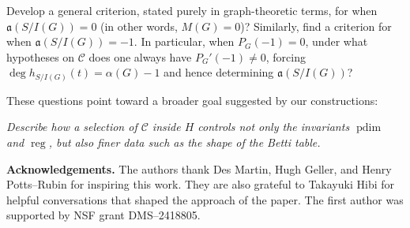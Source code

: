\documentclass[12pt]{amsart}
\theoremstyle{plain}
\theoremstyle{definition}
\DeclareMathOperator{\reg}{reg}
\DeclareMathOperator{\pdim}{pdim}
\begin{document}
\begin{question}
 Develop a general criterion, stated purely in graph-theoretic terms, for when $\mathfrak a (S/I(G))=0$ (in other words,  $M(G)=0$)? 
 Similarly, find a criterion for when $\mathfrak a (S/I(G))=-1$.  In particular, when $P_G(-1)=0$,
under what hypotheses on $\mathcal C$ does one always have $P_G'(-1)\neq 0$, forcing
$\deg h_{S/I(G)}(t)=\alpha(G)-1$ and hence determining $\mathfrak a (S/I(G))$?
\end{question}

These questions point toward a broader goal suggested by our constructions:

\emph{Describe how a selection of $\mathcal C$ inside $H$ controls not only the  invariants $\pdim$ and $\reg$,
but also finer data such as the shape of the Betti table.}


\textbf{Acknowledgements.} The authors thank Des Martin, Hugh Geller, and Henry Potts--Rubin for inspiring this work. They are also grateful to Takayuki Hibi for helpful conversations that shaped the approach of the paper. The first author was supported by NSF grant DMS--2418805.




\end{document}
